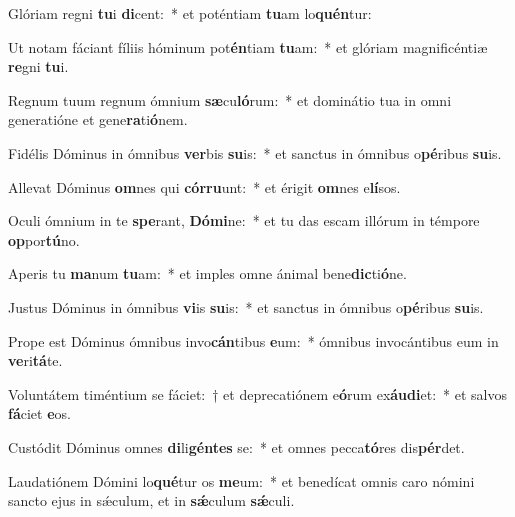 \item Glóriam regni \textbf{tu}i \textbf{di}cent:~* et poténtiam \textbf{tu}am lo\textbf{quén}tur:
\item Ut notam fáciant fíliis hóminum pot\textbf{én}tiam \textbf{tu}am:~* et glóriam magnificéntiæ \textbf{re}gni \textbf{tu}i.
\item Regnum tuum regnum ómnium \textbf{sæ}cu\textbf{ló}rum:~* et dominátio tua in omni generatióne et gene\textbf{ra}ti\textbf{ó}nem.
\item Fidélis Dóminus in ómnibus \textbf{ver}bis \textbf{su}is:~* et sanctus in ómnibus o\textbf{pé}ribus \textbf{su}is.
\item Allevat Dóminus \textbf{om}nes qui \textbf{cór}\textbf{ru}unt:~* et érigit \textbf{om}nes e\textbf{lí}sos.
\item Oculi ómnium in te \textbf{spe}rant, \textbf{Dó}\textbf{mi}ne:~* et tu das escam illórum in témpore \textbf{op}por\textbf{tú}no.
\item Aperis tu \textbf{ma}num \textbf{tu}am:~* et imples omne ánimal bene\textbf{dic}ti\textbf{ó}ne.
\item Justus Dóminus in ómnibus \textbf{vi}is \textbf{su}is:~* et sanctus in ómnibus o\textbf{pé}ribus \textbf{su}is.
\item Prope est Dóminus ómnibus invo\textbf{cán}tibus \textbf{e}um:~* ómnibus invocántibus eum in \textbf{ve}ri\textbf{tá}te.
\item Voluntátem timéntium se fáciet:~† et deprecatiónem e\textbf{ó}rum ex\textbf{áu}\textbf{di}et:~* et salvos \textbf{fá}ciet \textbf{e}os.
\item Custódit Dóminus omnes \textbf{di}li\textbf{gén}\textbf{tes} se:~* et omnes pecca\textbf{tó}res dis\textbf{pér}det.
\item Laudatiónem Dómini lo\textbf{qué}tur os \textbf{me}um:~* et benedícat omnis caro nómini sancto ejus in sǽculum, et in \textbf{sǽ}culum \textbf{sǽ}culi.
